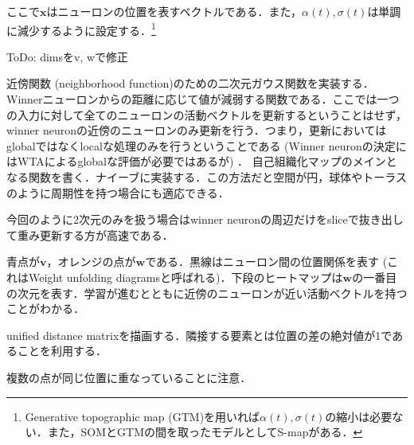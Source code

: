 ここで$\mathbf{x}$はニューロンの位置を表すベクトルである．また，$\alpha(t), \sigma(t)$は単調に減少するように設定する．\footnote{Generative topographic map (GTM)を用いれば$\alpha(t), \sigma(t)$の縮小は必要ない．また，SOMとGTMの間を取ったモデルとしてS-mapがある．}

ToDo: dimsをv, wで修正




近傍関数 (neighborhood function)のための二次元ガウス関数を実装する．Winnerニューロンからの距離に応じて値が減弱する関数である．ここでは一つの入力に対して全てのニューロンの活動ベクトルを更新するということはせず，winner neuronの近傍のニューロンのみ更新を行う．つまり，更新においてはglobalではなくlocalな処理のみを行うということである  (Winner neuronの決定にはWTAによるglobalな評価が必要ではあるが) ．
自己組織化マップのメインとなる関数を書く．ナイーブに実装する．この方法だと空間が円，球体やトーラスのように周期性を持つ場合にも適応できる．

今回のように2次元のみを扱う場合はwinner neuronの周辺だけをsliceで抜き出して重み更新する方が高速である．



青点が$\mathbf{v}$，オレンジの点が$\mathbf{w}$である．黒線はニューロン間の位置関係を表す (これはWeight unfolding diagramsと呼ばれる)．下段のヒートマップは$\mathbf{w}$の一番目の次元を表す．学習が進むとともに近傍のニューロンが近い活動ベクトルを持つことがわかる．



unified distance matrixを描画する．隣接する要素とは位置の差の絶対値が1であることを利用する．




複数の点が同じ位置に重なっていることに注意．


